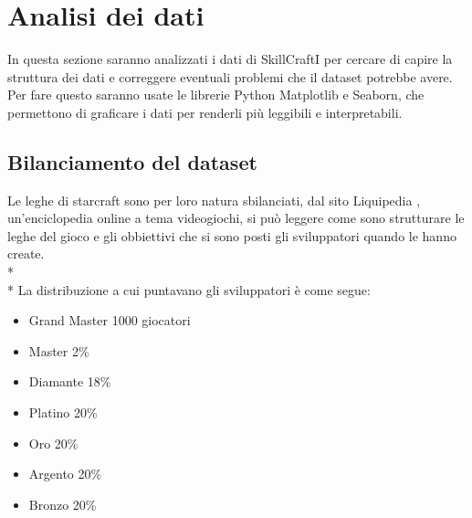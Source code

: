 \section{Analisi dei dati}\label{sec:analisi}
\normalsize
In questa sezione saranno analizzati i dati di SkillCraftI per cercare di capire la struttura dei dati e correggere eventuali problemi che il dataset potrebbe avere. Per fare questo saranno usate le librerie Python Matplotlib e Seaborn, che permettono di graficare i dati per renderli più leggibili e interpretabili.   
\subsection{Bilanciamento del dataset}\label{ssec:bilanciamento}
\normalsize
\par
Le leghe di starcraft sono per loro natura sbilanciati, dal sito Liquipedia \cite{liquipedia}, un'enciclopedia online a tema videogiochi, si può leggere come sono strutturare le leghe del gioco e gli obbiettivi che si sono posti gli sviluppatori quando le hanno create. \\*\\*
La distribuzione a cui puntavano gli sviluppatori è come segue:
\begin{itemize}
	\item Grand Master 1000 giocatori
	\item Master 2\%
	\item Diamante 18\%
	\item Platino 20\%
	\item Oro 20\%
	\item Argento 20\% 
	\item Bronzo 20\%
\end{itemize}

